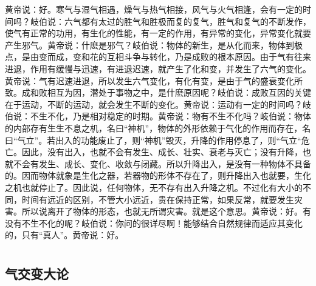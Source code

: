 \documentclass[12pt,UTF8]{ctexbook}
\begin{document}
黄帝说：好。寒气与湿气相遇，燥气与热气相接，风气与火气相逢，会有一定的时间吗？岐伯说：六气都有太过的胜气和胜极而复的复气，胜气和复气的不断发作，使气有正常的功用，有生化的性能，有一定的作用，有异常的变化，异常变化就要产生邪气。黄帝说：什麽是邪气？岐伯说：物体的新生，是从化而来，物体到极点，是由变而成，变和花的互相斗争与转化，乃是成败的根本原因。由于气有往来进退，作用有缓慢与迅速，有进退迟速，就产生了化和变，并发生了六气的变化。黄帝说：气有迟速进退，所以发生六气变化，有化有变，是由于气的盛衰变化所致。成和败相互为因，潜处于事物之中，是什麽原因呢？岐伯说：成败互因的关键在于运动，不断的运动，就会发生不断的变化。黄帝说：运动有一定的时间吗？岐伯说：不生不化，乃是相对稳定的时期。黄帝说：物有不生不化吗？岐伯说：物体的内部存有生生不息之机，名曰“神机”，物体的外形依赖于气化的作用而存在，名曰“气立”。若出入的功能废止了，则“神机”毁灭，升降的作用停息了，则“气立“危亡。因此，没有出入，也就不会有发生、成长、壮实、衰老与灭亡；没有升降，也就不会有发生、成长、变化、收敛与闭藏。所以升降出入，是没有一种物体不具备的。因而物体就象是生化之器，若器物的形体不存在了，则升降出入也就要，生化之机也就停止了。因此说，任何物体，无不存有出入升降之机。不过化有大小的不同，时间有远近的区别，不管大小远近，贵在保持正常，如果反常，就要发生灾害。所以说离开了物体的形态，也就无所谓灾害。就是这个意思。黄帝说：好。有没有不生不化的呢？岐伯说：你问的很详尽啊！能够结合自然规律而适应其变化的，只有“真人”。黄帝说：好。

\part{}

\chapter{气交变大论}
\end{document}
